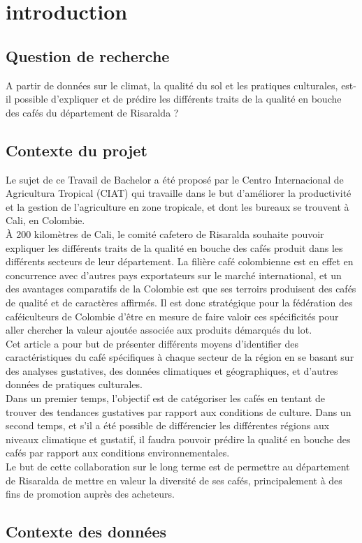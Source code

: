 \chapter{introduction}
\section{Question de recherche}

A partir de données sur le climat, la qualité du sol et les pratiques culturales, est-il possible d’expliquer et de prédire les différents traits de la qualité en bouche des cafés du département de Risaralda ?



\section{Contexte du projet}
Le sujet de ce Travail de Bachelor a été proposé par le Centro Internacional de Agricultura Tropical (CIAT) qui travaille dans le but d’améliorer la productivité et la gestion de l’agriculture en zone tropicale, et dont les bureaux se trouvent à Cali, en Colombie.\\

À 200 kilomètres de Cali, le comité cafetero de Risaralda souhaite pouvoir expliquer les différents traits de la qualité en bouche des cafés produit dans les différents secteurs de leur département. La filière café colombienne est en effet en concurrence avec d’autres pays exportateurs sur le marché international, et un des avantages comparatifs de la Colombie est que ses terroirs produisent des cafés de qualité et de caractères affirmés. Il est donc stratégique pour la fédération des caféiculteurs de Colombie d'être en mesure de faire valoir ces spécificités pour aller chercher la valeur ajoutée associée aux produits démarqués du lot.\\

Cet article a pour but de présenter différents moyens d’identifier des caractéristiques du café spécifiques à chaque secteur de la région en se basant sur des analyses gustatives, des données climatiques et géographiques, et d’autres données de pratiques culturales.\\

Dans un premier temps, l’objectif est de catégoriser les cafés en tentant de trouver des tendances gustatives par rapport aux conditions de culture. Dans un second temps, et s’il a été possible de différencier les différentes régions aux niveaux climatique et gustatif, il faudra pouvoir prédire la qualité en bouche des cafés par rapport aux conditions environnementales.\\
Le but de cette collaboration sur le long terme est de permettre au département de Risaralda de mettre en valeur la diversité de ses cafés, principalement à des fins de promotion auprès des acheteurs.\\

\section{Contexte des données}


